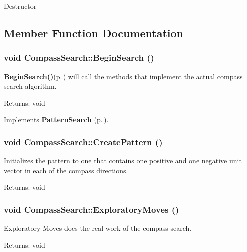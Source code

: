 Destructor 

\subsection{Member Function Documentation}
\subsubsection{\setlength{\rightskip}{0pt plus 5cm}void Compass\-Search::Begin\-Search ()\hspace{0.3cm}{\tt  [virtual]}}\label{classCompassSearch_z5_1}


{\bf Begin\-Search()}{\rm (p.\,\pageref{classCompassSearch_z5_1})} will call the methods that implement the actual compass search algorithm. \begin{Desc}
\item[Returns:]void \end{Desc}


Implements {\bf Pattern\-Search} {\rm (p.\,\pageref{classPatternSearch_z19_0})}.
\subsubsection{\setlength{\rightskip}{0pt plus 5cm}void Compass\-Search::Create\-Pattern ()\hspace{0.3cm}{\tt  [protected]}}\label{classCompassSearch_b1}


Initializes the pattern to one that contains one positive and one negative unit vector in each of the compass directions. \begin{Desc}
\item[Returns:]void \end{Desc}
\subsubsection{\setlength{\rightskip}{0pt plus 5cm}void Compass\-Search::Exploratory\-Moves ()\hspace{0.3cm}{\tt  [protected, virtual]}}\label{classCompassSearch_b0}


Exploratory Moves does the real work of the compass search. \begin{Desc}
\item[Returns:]void \end{Desc}


